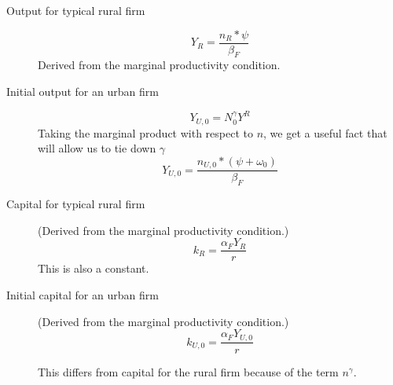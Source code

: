 \documentclass[]{article}
\begin{document}
\begin{description}


\item[Output for typical rural firm]  
\begin{equation}Y_R=\frac{n_R*\psi}{\beta_F}\label{eqn_Rural_output}\end{equation}
Derived from the marginal productivity condition.


\item[Initial output for an urban firm] 
\[Y_{U, 0} = N_0^\gamma Y^R\]  
Taking the marginal product with respect to $n$, we get a useful fact that will allow us to tie down $\gamma$
\[Y_{U,0} = \frac{n_{U,0}*(\psi+\omega_0)}{\beta_F}\]

\item[Capital for typical rural firm] (Derived from the marginal productivity condition.)
\[k_R=  \frac{\alpha_F Y_R }{r}\]
This is also a constant.
 
\item[Initial capital for an urban firm] (Derived from the marginal productivity condition.)
\[k_{U,0}=  \frac{\alpha_F Y_{U,0} }{r}\]


This differs from capital  for the rural firm because of the term $n^\gamma$. 


\end{description}
\end{document}
